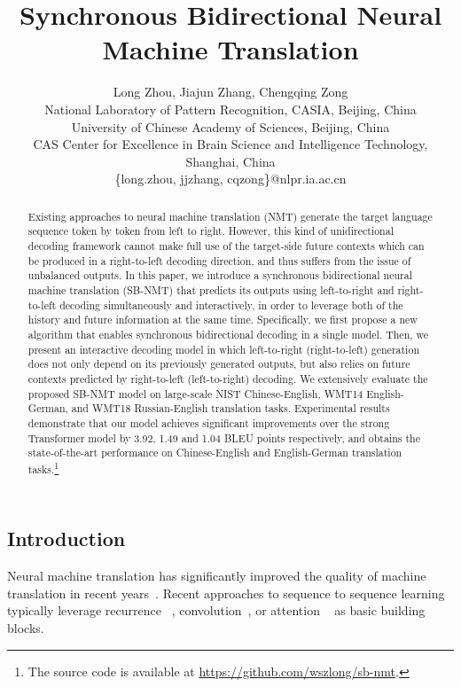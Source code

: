 \documentclass[11pt,a4paper]{article}
\title{Synchronous Bidirectional Neural Machine Translation}
\author{Long Zhou, Jiajun Zhang\Thanks{Corresponding author.}, Chengqing Zong\\
	National Laboratory of Pattern Recognition, CASIA, Beijing, China \\
	University of Chinese Academy of Sciences, Beijing, China \\
	CAS Center for Excellence in Brain Science and Intelligence Technology, Shanghai, China \\
	{\sf \{long.zhou, jjzhang, cqzong\}@nlpr.ia.ac.cn }\\
}
\date{}
\begin{document}
\begin{CJK*}{UTF8}{gbsn}


\maketitle

\begin{abstract}
Existing approaches to neural machine translation (NMT) generate the target language sequence token by token from left to right. However, this kind of unidirectional decoding framework cannot make full use of the target-side future contexts which can be produced in a right-to-left decoding direction, and thus suffers from the issue of unbalanced outputs.
In this paper, we introduce a synchronous bidirectional neural machine translation (SB-NMT) that predicts its outputs using left-to-right and right-to-left decoding simultaneously and interactively, in order to leverage both of the history and future information at the same time.
Specifically, we first propose a new algorithm that enables synchronous bidirectional decoding in a single model. Then, we present an interactive decoding model in which left-to-right (right-to-left) generation does not only depend on its previously generated outputs, but also relies on future contexts predicted by right-to-left (left-to-right) decoding.
We extensively evaluate the proposed SB-NMT model on large-scale NIST Chinese-English, WMT14 English-German, and WMT18 Russian-English translation tasks.
Experimental results demonstrate that our model achieves significant improvements over the strong Transformer model by 3.92, 1.49 and 1.04 BLEU points respectively, and obtains the state-of-the-art performance on Chinese-English and English-German translation tasks.{\footnote[1]{The source code is available at \url{https://github.com/wszlong/sb-nmt}.}}
\end{abstract}

\section{Introduction}

Neural machine translation has significantly improved the quality of machine translation in recent years~\cite{Sutskever:2014,Bahdanau:2015,Zhang:2015,Wu:2016, gehring2017convolutional,vaswani2017attention}.
Recent approaches to sequence to sequence learning typically leverage recurrence ~\cite{Sutskever:2014}, convolution~\cite{gehring2017convolutional}, or attention ~\cite{vaswani2017attention} as basic building blocks.



\end{CJK*}
\end{document}

